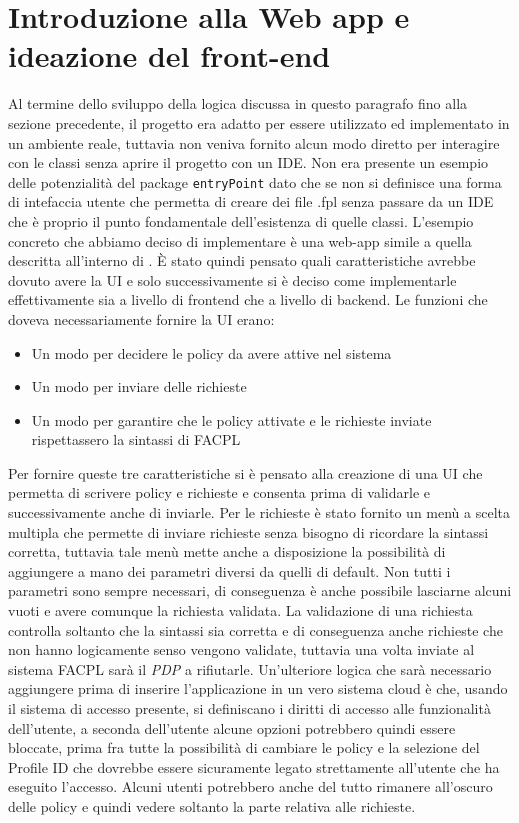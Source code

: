 \section{Introduzione alla Web app e ideazione del front-end}
Al termine dello sviluppo della logica discussa in questo paragrafo fino alla sezione precedente, il progetto era adatto per essere utilizzato ed implementato in un ambiente reale, tuttavia non veniva fornito alcun modo diretto per interagire con le classi senza aprire il progetto con un IDE. Non era presente un esempio delle potenzialità del package \texttt{entryPoint} dato che se non si definisce una forma di intefaccia utente che permetta di creare dei file .fpl senza passare da un IDE che è proprio il punto fondamentale dell'esistenza di quelle classi.\medbreak
L'esempio concreto che abbiamo deciso di implementare è una web-app simile a quella descritta all'interno di \cite{10.1007/978-3-319-08260-8_6}. È stato quindi pensato quali caratteristiche avrebbe dovuto avere la UI e solo successivamente si è deciso come implementarle effettivamente sia a livello di frontend che a livello di backend. Le funzioni che doveva necessariamente fornire la UI erano:
\begin{itemize}
    \item Un modo per decidere le policy da avere attive nel sistema
    \item Un modo per inviare delle richieste
    \item Un modo per garantire che le policy attivate e le richieste inviate rispettassero la sintassi di FACPL
\end{itemize}
Per fornire queste tre caratteristiche si è pensato alla creazione di una UI che permetta di scrivere policy e richieste e consenta prima di validarle e successivamente anche di inviarle. Per le richieste è stato fornito un menù a scelta multipla che permette di inviare richieste senza bisogno di ricordare la sintassi corretta, tuttavia tale menù mette anche a disposizione la possibilità di aggiungere a mano dei parametri diversi da quelli di default. Non tutti i parametri sono sempre necessari, di conseguenza è anche possibile lasciarne alcuni vuoti e avere comunque la richiesta validata. La validazione di una richiesta controlla soltanto che la sintassi sia corretta e di conseguenza anche richieste che non hanno logicamente senso vengono validate, tuttavia una volta inviate al sistema FACPL sarà il \emph{PDP} a rifiutarle.\medbreak
Un'ulteriore logica che sarà necessario aggiungere prima di inserire l'applicazione in un vero sistema cloud è che, usando il sistema di accesso presente, si definiscano i diritti di accesso alle funzionalità dell'utente, a seconda dell'utente alcune opzioni potrebbero quindi essere bloccate, prima fra tutte la possibilità di cambiare le policy e la selezione del Profile ID che dovrebbe essere sicuramente legato strettamente all'utente che ha eseguito l'accesso. Alcuni utenti potrebbero anche del tutto rimanere all'oscuro delle policy e quindi vedere soltanto la parte relativa alle richieste.\medbreak

